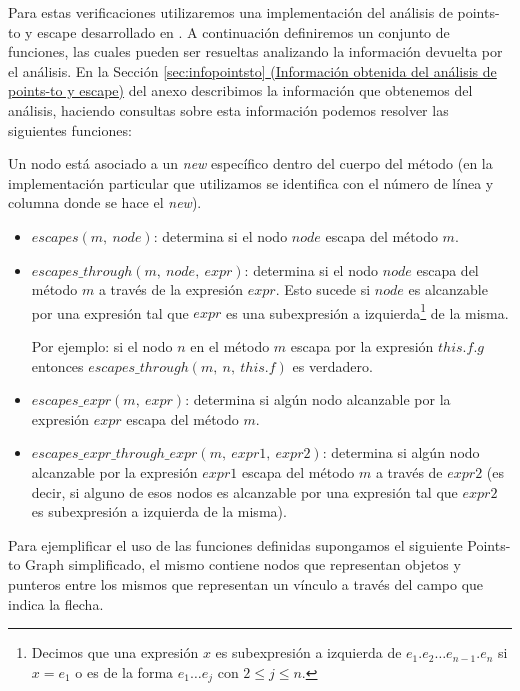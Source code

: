 \documentclass[12pt,a4paper]{article}
\begin{document}
			Para estas verificaciones utilizaremos una implementación del análisis de points-to y escape desarrollado en \cite{BFGL07}. A continuación definiremos un conjunto de funciones, las cuales pueden ser resueltas analizando la información devuelta por el análisis. En la Sección \hyperref[sec:infopointsto]{\ref*{sec:infopointsto} (Información obtenida del análisis de points-to y escape)} del anexo describimos la información que obtenemos del análisis, haciendo consultas sobre esta información podemos resolver las siguientes funciones:

			Un nodo está asociado a un \textit{new} específico dentro del cuerpo del método (en la implementación particular que utilizamos se identifica con el número de línea y columna donde se hace el \textit{new}).

			\begin{itemize}
				\item $escapes(m,\ node)$: determina si el nodo $node$ escapa del método $m$.
				\item $escapes\_through(m,\ node,\ expr)$: determina si el nodo $node$ escapa del método $m$ a través de la expresión $expr$. Esto sucede si $node$ es alcanzable por una expresión tal que $expr$ es una subexpresión a izquierda\footnote{Decimos que una expresión $x$ es subexpresión a izquierda de $e_1.e_2\dots e_{n-1}.e_n$ si $x = e_1$ o es de la forma $e_1\dots e_j$ con $2 \leq j \leq n$.} de la misma.

				Por ejemplo: si el nodo $n$ en el método $m$ escapa por la expresión $this.f.g$ entonces $escapes\_through(m,\ n,\ this.f)$ es verdadero.
				\item $escapes\_expr(m,\ expr)$: determina si algún nodo alcanzable por la expresión $expr$ escapa del método $m$.
				\item $escapes\_expr\_through\_expr(m,\ expr1,\ expr2)$: determina si algún nodo alcanzable por la expresión $expr1$ escapa del método $m$ a través de $expr2$ (es decir, si alguno de esos nodos es alcanzable por una expresión tal que $expr2$ es subexpresión a izquierda de la misma).
			\end{itemize}

			Para ejemplificar el uso de las funciones definidas supongamos el siguiente Points-to Graph simplificado, el mismo contiene nodos que representan objetos y punteros entre los mismos que representan un vínculo a través del campo que indica la flecha.
\end{document}
